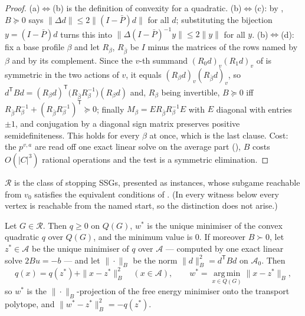 \begin{proof}
(a)$\Leftrightarrow$(b) is the definition of convexity for a quadratic.
(b)$\Leftrightarrow$(c): by , $B\succeq0$ says
$\|\Delta d\|\le2\|(I-\bar P)d\|$ for all $d$; substituting the bijection
$y=(I-\bar P)d$ turns this into $\|\Delta(I-\bar P)^{-1}y\|\le2\|y\|$ for
all $y$.
(b)$\Leftrightarrow$(d): fix a base profile $\beta$ and let $R_\beta$,
$R_{\bar\beta}$ be $I$ minus the matrices of the rows named by $\beta$ and
by its complement. Since the $v$-th summand $(R_0d)_v(R_1d)_v$ of
 is symmetric in the two actions of $v$, it equals
$(R_\beta d)_v(R_{\bar\beta}d)_v$, so
$d^{\mathsf T}Bd=(R_\beta d)^{\mathsf T}\bigl(R_{\bar\beta}R_\beta^{-1}\bigr)(R_\beta d)$
and, $R_\beta$ being invertible, $B\succeq0$ iff
$R_{\bar\beta}R_\beta^{-1}+(R_{\bar\beta}R_\beta^{-1})^{\mathsf T}\succeq0$;
finally $M_\beta=ER_{\bar\beta}R_\beta^{-1}E$ with $E$ diagonal with entries
$\pm1$, and conjugation by a diagonal sign matrix preserves positive
semidefiniteness. This holds for every $\beta$ at once, which is the last
clause. Cost: the $p^{v,a}$ are read off one
exact linear solve on the average part (), $B$ costs
$O(|C|^{3})$ rational operations and the test is a symmetric elimination.
\end{proof}

\begin{definition}\label{vr:class}
$\mathcal R$ is the class of stopping SSGs, presented as instances, whose
subgame reachable from $v_0$ satisfies the equivalent conditions of
. (In every witness below every vertex is reachable from
the named start, so the distinction does not arise.)
\end{definition}

\begin{theorem}\label{vr:variational}
Let $G\in\mathcal R$. Then $q\ge0$ on $Q(G)$, $w^{\ast}$ is the unique
minimiser of the convex quadratic $q$ over $Q(G)$, and the minimum value is
$0$. If moreover $B\succ0$, let $z^{\ast}\in\mathcal A$ be the unique
minimiser of $q$ over $\mathcal A$ --- computed by one exact linear solve
$2Bu=-b$ --- and let $\|\cdot\|_B$ be the norm $\|d\|_B^2=d^{\mathsf T}Bd$
on $\mathcal A_0$. Then
\[
  q(x)=q(z^{\ast})+\|x-z^{\ast}\|_B^{2}\quad(x\in\mathcal A),
  \qquad
  w^{\ast}=\operatorname*{arg\,min}_{x\in Q(G)}\|x-z^{\ast}\|_B ,
\]
so $w^{\ast}$ is the $\|\cdot\|_B$-projection of the free energy minimiser
onto the transport polytope, and $\|w^\ast-z^\ast\|_B^2=-q(z^\ast)$.
\end{theorem}

